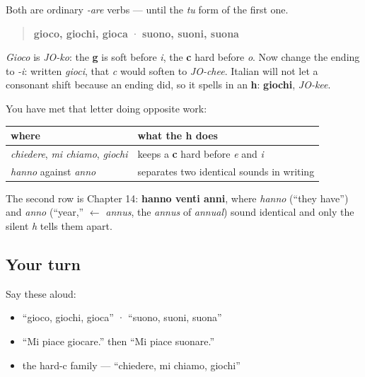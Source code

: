 \begin{grammarlens}[title={Grammar Lens: the h that keeps a c hard}]
Both are ordinary \emph{-are} verbs — until the \emph{tu} form of the first one.

\begin{quote}
\textbf{gioco, giochi, gioca} · \textbf{suono, suoni, suona}
\end{quote}

\emph{Gioco} is \emph{JO-ko}: the \textbf{g} is soft before \emph{i}, the \textbf{c} hard before \emph{o}. Now change the ending to \emph{-i}: written \emph{gioci}, that \emph{c} would soften to \emph{JO-chee}. Italian will not let a consonant shift because an ending did, so it spells in an \textbf{h}: \textbf{giochi}, \emph{JO-kee}.

You have met that letter doing opposite work:

\noindent
\begin{tabularx}{\linewidth}{@{}>{\raggedright\arraybackslash}X>{\raggedright\arraybackslash}X@{}}
\toprule
\textbf{where} & \textbf{what the h does} \\
\midrule
\emph{chiedere}, \emph{mi chiamo}, \emph{giochi} & keeps a \textbf{c} hard before \emph{e} and \emph{i} \\
\emph{hanno} against \emph{anno} & separates two identical sounds in writing \\
\bottomrule
\end{tabularx}

The second row is Chapter 14: \textbf{hanno venti anni}, where \emph{hanno} (\textquotedblleft{}they have\textquotedblright{}) and \emph{anno} (\textquotedblleft{}year,\textquotedblright{} $\leftarrow$ \emph{annus}, the \emph{annus} of \emph{annual}) sound identical and only the silent \emph{h} tells them apart.
\end{grammarlens}

\subsection*{Your turn}
Say these aloud:

\begin{itemize}
\raggedright
  \item \textquotedblleft{}gioco, giochi, gioca\textquotedblright{} · \textquotedblleft{}suono, suoni, suona\textquotedblright{}
  \item \textquotedblleft{}Mi piace giocare.\textquotedblright{} then \textquotedblleft{}Mi piace suonare.\textquotedblright{}
  \item the hard-c family — \textquotedblleft{}chiedere, mi chiamo, giochi\textquotedblright{}
\end{itemize}

